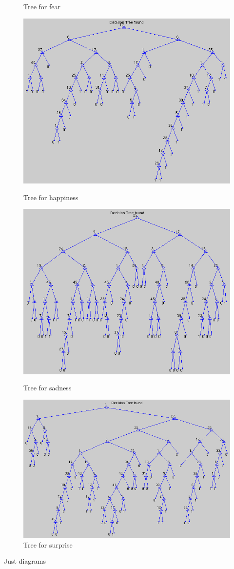 \documentclass[12pt]{article}
\begin{document}
\begin{figure}[h]
  \caption{Tree for fear}
\hfill
  \includegraphics{report-images/tree4.png}
  \caption{Tree for happiness}
\hfill
  \includegraphics{report-images/tree5.png}
  \caption{Tree for sadness}
\hfill
  \includegraphics{report-images/tree6.png}
  \caption{Tree for surprise}
\end{figure}
Just diagrams \\
\end{document}
